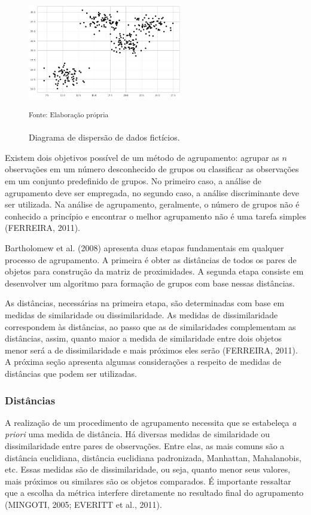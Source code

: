 \documentclass[12pt, a4paper,brazil,oneside]{article}
\begin{document}
	\begin{figure}[h!]
		\centering
		\includegraphics[width=0.6\textwidth]{img/fake_cluster.png}
		\caption{Diagrama de dispersão de dados fictícios.}
		\small \textsuperscript {Fonte: Elaboração própria}
		\label{fake_cluster}
	\end{figure}
	
	Existem dois objetivos possível de um método de agrupamento: agrupar as $n$ observações em um número desconhecido de grupos ou classificar as observações em um conjunto predefinido de grupos. No primeiro caso, a análise de agrupamento deve ser empregada, no segundo caso, a análise discriminante deve ser utilizada. Na análise de agrupamento, geralmente, o número de grupos não é conhecido a princípio e encontrar o melhor agrupamento não é uma tarefa simples (FERREIRA, 2011). 
	
	Bartholomew et al. (2008) apresenta duas etapas fundamentais em qualquer processo de agrupamento. A primeira é obter as distâncias de todos os pares de objetos para construção da matriz de proximidades. A segunda etapa consiste em desenvolver um algoritmo para formação de grupos com base nessas distâncias. 
	
	As distâncias, necessárias na primeira etapa, são determinadas com base em medidas de similaridade ou dissimilaridade. As medidas de dissimilaridade correspondem às distâncias, ao passo que as de similaridades complementam as distâncias, assim, quanto maior a medida de similaridade entre dois objetos menor será a de dissimilaridade e mais próximos eles serão (FERREIRA, 2011). A próxima seção apresenta algumas considerações a respeito de medidas de distâncias que podem ser utilizadas. 
	
	\subsubsection{Distâncias} 
	
	A realização de um procedimento de agrupamento necessita que se estabeleça \textit{a priori} uma medida de distância. Há diversas medidas de similaridade ou dissimilaridade entre pares de observações. Entre elas, as mais comuns são a distância euclidiana, distância euclidiana padronizada, Manhattan, Mahalanobis, etc. Essas medidas são de dissimilaridade, ou seja, quanto menor seus valores, mais próximos ou similares são os objetos comparados. É importante ressaltar que a escolha da métrica interfere diretamente no resultado final do agrupamento (MINGOTI, 2005; EVERITT et al., 2011). 
	
\end{document}
